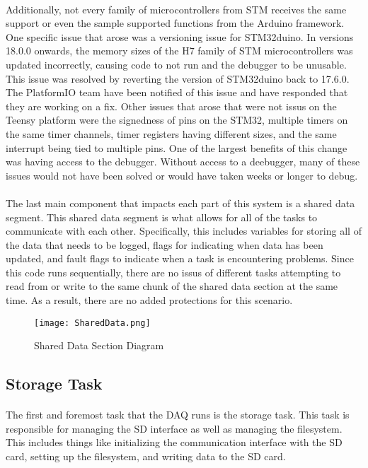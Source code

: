 \paragraph{}
Additionally, not every family of microcontrollers from STM receives the same support or even the sample supported functions from the Arduino framework.
One specific issue that arose was a versioning issue for STM32duino.
In versions 18.0.0 onwards, the memory sizes of the H7 family of STM microcontrollers was updated incorrectly, causing code to not run and the debugger to be unusable.
This issue was resolved by reverting the version of STM32duino back to 17.6.0.
The PlatformIO team have been notified of this issue and have responded that they are working on a fix.
Other issues that arose that were not issus on the Teensy platform were the signedness of pins on the STM32, multiple timers on the same timer channels, timer registers having different sizes, and the same interrupt being tied to multiple pins.
One of the largest benefits of this change was having access to the debugger.
Without access to a deebugger, many of these issues would not have been solved or would have taken weeks or longer to debug.

\paragraph{}
The last main component that impacts each part of this system is a shared data segment.
This shared data segment is what allows for all of the tasks to communicate with each other.
Specifically, this includes variables for storing all of the data that needs to be logged, flags for indicating when data has been updated, and fault flags to indicate when a task is encountering problems.
Since this code runs sequentially, there are no issus of different tasks attempting to read from or write to the same chunk of the shared data section at the same time.
As a result, there are no added protections for this scenario.

\begin{figure}[H]
	\centering
	\texttt{[image: SharedData.png]}
	\caption{Shared Data Section Diagram}
	\label{fig:SharedData}
\end{figure}

\subsection{Storage Task}

\paragraph{}
The first and foremost task that the DAQ runs is the storage task.
This task is responsible for managing the SD interface as well as managing the filesystem.
This includes things like initializing the communication interface with the SD card, setting up the filesystem, and writing data to the SD card.

